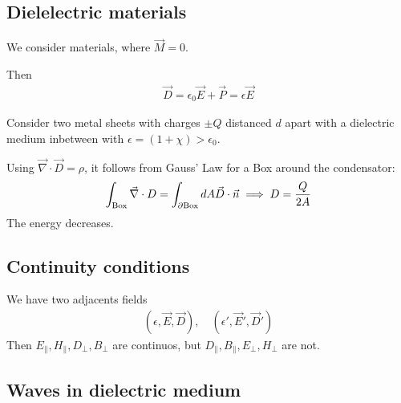 \subsection{Dielelectric materials}
We consider materials, where $\vec{M} = 0$.

Then
\begin{align*} 
  \vec{D} = \epsilon_0 \vec{E} + \vec{P} = \epsilon \vec{E}
\end{align*}

\begin{ex}[]
  Consider two metal sheets with charges $\pm Q$ distanced $d$ apart with a dielectric medium inbetween with $\epsilon = (1 + \chi) > \epsilon_0$.


  Using $\vec{\nabla} \cdot \vec{D} = \rho$, it follows from Gauss' Law for a Box around the condensator:
  \begin{align*}
    \int_{\text{Box}} \vec{\nabla} \cdot D =  \int_{\partial \text{Box}} dA \vec{D} \cdot \vec{n} \implies D = \frac{Q}{2A}
  \end{align*}
  The energy decreases.
\end{ex}

\subsection{Continuity conditions}

We have two adjacents fields
\begin{align*}
  (\epsilon,\vec{E},\vec{D}), \quad (\epsilon', \vec{E}',\vec{D}')
\end{align*}
Then $E_{\parallel},H_{\parallel},D_{\bot},B_{\bot}$ are continuos, but $D_{\parallel},B_{\parallel},E_{\bot},H_{\bot}$ are not.


\subsection{Waves in dielectric medium}


